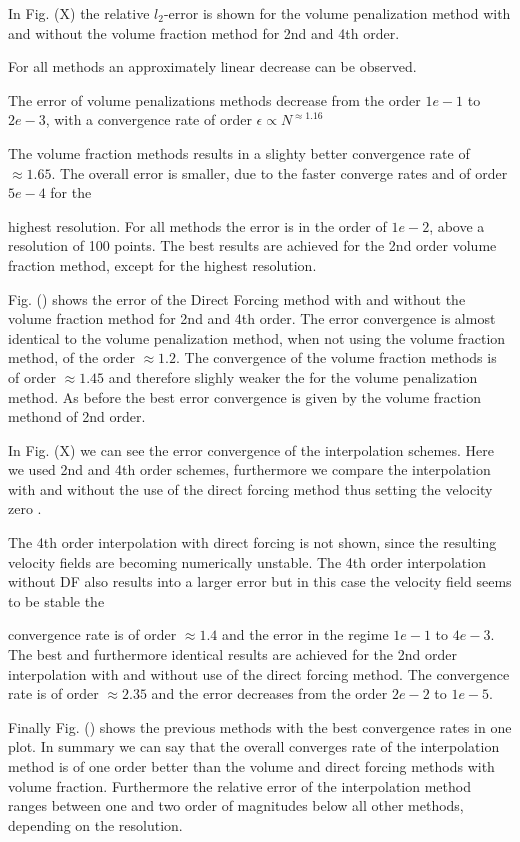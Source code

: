 In Fig. (X) the relative $l_2$-error is shown for the volume penalization method with and without the volume fraction method
for 2nd and 4th order.

For all methods an approximately linear decrease  can be observed.

The error of volume penalizations methods decrease from the order $1e-1$ to $2e-3$, with
a convergence rate of order  $\epsilon \propto N^{\approx1.16}$

The volume fraction methods results in a slighty better convergence rate of $\approx 1.65$.
The overall error is smaller, due to the faster converge rates and of order $5e-4$ for the

highest resolution. For all methods the error is in the order of $1e-2$, above a resolution of 100 points.
The best results are achieved for the 2nd order volume fraction method, except for the highest resolution.

Fig. () shows the error of the Direct Forcing method with and without the volume fraction method for 2nd
and 4th order. The error convergence is almost identical to the volume penalization method, when not using the volume
fraction method, of the order $\approx 1.2$. The convergence of the volume fraction methods is of order $\approx 1.45$
and therefore slighly weaker the for the volume penalization method.
As before the best error convergence is given by the volume fraction methond of 2nd order.

In Fig. (X) we can see the error convergence of the interpolation schemes.
Here we used 2nd and 4th order schemes, furthermore we compare the interpolation with and without the
use of the direct forcing method thus setting the velocity zero .

The 4th order interpolation with direct forcing is not shown, since the resulting velocity fields are becoming
numerically unstable. The 4th order interpolation without DF also results into a larger error but in this case
the velocity field seems to be stable the

convergence rate is of order $\approx 1.4$ and the error in the regime $1e-1$ to $4e-3$.
The best and furthermore identical results are achieved for the 2nd order interpolation with and without
use of the direct forcing method. The convergence rate is of order $\approx 2.35$ and the error
decreases from the order $2e-2$ to $1e-5$.

Finally Fig. () shows the previous methods with the best convergence rates in one plot.
In summary we can say that the overall converges rate of the interpolation method is of one order better
than the volume and direct forcing methods with volume fraction. Furthermore the relative error of the interpolation method ranges
between one and two order of magnitudes below all other methods, depending on the resolution.

